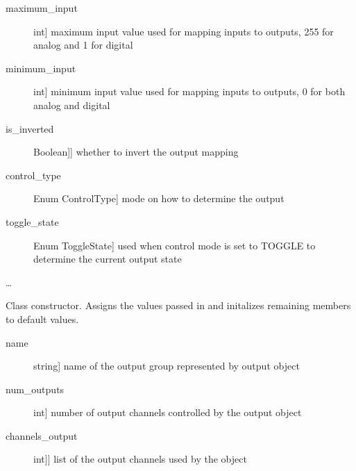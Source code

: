\documentclass[letterpaper,10pt,english]{sphinxmanual}
\begin{document}
\begin{fulllineitems}
\begin{description}
\item[{maximum\_input}] \leavevmode{[}int{]}
\sphinxAtStartPar
maximum input value used for mapping inputs to outputs, 255 for analog and 1 for digital

\item[{minimum\_input}] \leavevmode{[}int{]}
\sphinxAtStartPar
minimum input value used for mapping inputs to outputs, 0 for both analog and digital

\item[{is\_inverted}] \leavevmode{[}{[}Boolean{]}{]}
\sphinxAtStartPar
whether to invert the output mapping

\item[{control\_type}] \leavevmode{[}Enum ControlType{]}
\sphinxAtStartPar
mode on how to determine the output

\item[{toggle\_state}] \leavevmode{[}Enum ToggleState{]}
\sphinxAtStartPar
used when control mode is set to TOGGLE to determine the current output state

\end{description}

\sphinxAtStartPar
…

\sphinxAtStartPar
{}

\begin{fulllineitems}
\label{\detokenize{base:OutputObject.OutputObject.__init__}}
\sphinxAtStartPar
Class constructor. Assigns the values passed in and initalizes remaining members to default values.

\sphinxAtStartPar
{}
\begin{description}
\item[{name}] \leavevmode{[}string{]}
\sphinxAtStartPar
name of the output group represented by output object

\item[{num\_outputs}] \leavevmode{[}int{]}
\sphinxAtStartPar
number of output channels controlled by the output object

\item[{channels\_output}] \leavevmode{[}{[}int{]}{]}
\sphinxAtStartPar
list of the output channels used by the object


\end{description}
\end{fulllineitems}
\end{fulllineitems}
\end{document}
